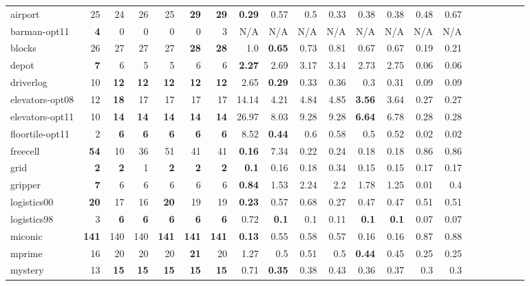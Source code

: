 \begin{table}[h!]
{\begin{tabular}{|l|r|r|r|r|r|r||r|r|r|r|r|r||r|r|r|r|r|r||r|r|}
\hline airport & 25 & 24 & 26 & 25 & \textbf{29} & \textbf{29} & \textbf{0.29} & 0.57 & 0.5 & 0.33 & 0.38 & 0.38 & 0.48 & 0.67 \\
barman-opt11 & \textbf{4} & 0 & 0 & 0 & 0 & 3 & N/A & N/A & N/A & N/A & N/A & N/A & N/A & N/A \\
blocks & 26 & 27 & 27 & 27 & \textbf{28} & \textbf{28} & 1.0 & \textbf{0.65} & 0.73 & 0.81 & 0.67 & 0.67 & 0.19 & 0.21 \\
depot & \textbf{7} & 6 & 5 & 5 & 6 & 6 & \textbf{2.27} & 2.69 & 3.17 & 3.14 & 2.73 & 2.75 & 0.06 & 0.06 \\
driverlog & 10 & \textbf{12} & \textbf{12} & \textbf{12} & \textbf{12} & \textbf{12} & 2.65 & \textbf{0.29} & 0.33 & 0.36 & 0.3 & 0.31 & 0.09 & 0.09 \\
elevators-opt08 & 12 & \textbf{18} & 17 & 17 & 17 & 17 & 14.14 & 4.21 & 4.84 & 4.85 & \textbf{3.56} & 3.64 & 0.27 & 0.27 \\
elevators-opt11 & 10 & \textbf{14} & \textbf{14} & \textbf{14} & \textbf{14} & \textbf{14} & 26.97 & 8.03 & 9.28 & 9.28 & \textbf{6.64} & 6.78 & 0.28 & 0.28 \\
floortile-opt11 & 2 & \textbf{6} & \textbf{6} & \textbf{6} & \textbf{6} & \textbf{6} & 8.52 & \textbf{0.44} & 0.6 & 0.58 & 0.5 & 0.52 & 0.02 & 0.02 \\
freecell & \textbf{54} & 10 & 36 & 51 & 41 & 41 & \textbf{0.16} & 7.34 & 0.22 & 0.24 & 0.18 & 0.18 & 0.86 & 0.86 \\
grid & \textbf{2} & \textbf{2} & 1 & \textbf{2} & \textbf{2} & \textbf{2} & \textbf{0.1} & 0.16 & 0.18 & 0.34 & 0.15 & 0.15 & 0.17 & 0.17 \\
gripper & \textbf{7} & 6 & 6 & 6 & 6 & 6 & \textbf{0.84} & 1.53 & 2.24 & 2.2 & 1.78 & 1.25 & 0.01 & 0.4 \\
logistics00 & \textbf{20} & 17 & 16 & \textbf{20} & 19 & 19 & \textbf{0.23} & 0.57 & 0.68 & 0.27 & 0.47 & 0.47 & 0.51 & 0.51 \\
logistics98 & 3 & \textbf{6} & \textbf{6} & \textbf{6} & \textbf{6} & \textbf{6} & 0.72 & \textbf{0.1} & 0.1 & 0.11 & \textbf{0.1} & \textbf{0.1} & 0.07 & 0.07 \\
miconic & \textbf{141} & 140 & 140 & \textbf{141} & \textbf{141} & \textbf{141} & \textbf{0.13} & 0.55 & 0.58 & 0.57 & 0.16 & 0.16 & 0.87 & 0.88 \\
mprime & 16 & 20 & 20 & 20 & \textbf{21} & 20 & 1.27 & 0.5 & 0.51 & 0.5 & \textbf{0.44} & 0.45 & 0.25 & 0.25 \\
mystery & 13 & \textbf{15} & \textbf{15} & \textbf{15} & \textbf{15} & \textbf{15} & 0.71 & \textbf{0.35} & 0.38 & 0.43 & 0.36 & 0.37 & 0.3 & 0.3 \\

\end{tabular}}
\end{table}
